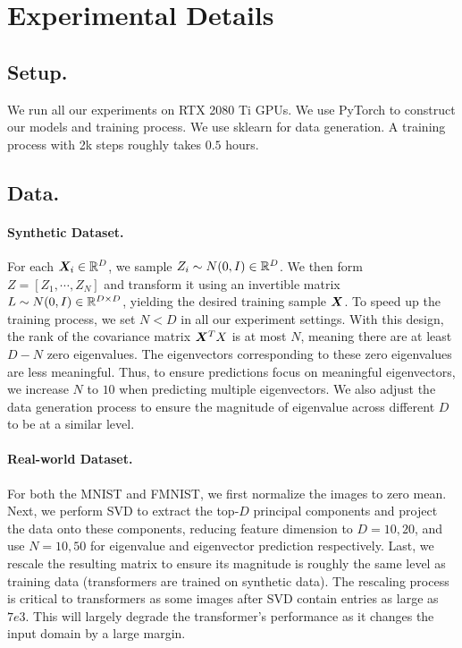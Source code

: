 \clearpage

\section{Experimental Details}\label{sec:exp_details}

\subsection{Setup.}
We run all our experiments on RTX 2080 Ti GPUs.
We use PyTorch to construct our models and training process.
We use sklearn for data generation.
A training process with 2k steps roughly takes $0.5$ hours.



\subsection{Data.}\label{appendix:data}
\paragraph{Synthetic Dataset.}
For each $\boldsymbol{X}_i \in \mathbb{R}^D$, we sample $Z_i \sim N(0, I) \in \mathbb{R}^D$.
We then form $Z = [Z_1, \cdots, Z_N]$ and transform it using an invertible matrix $L \sim N(0, I) \in \mathbb{R} ^{D \times D}$, yielding the desired training sample $\boldsymbol{X}$.
To speed up the training process, we set $N < D$ in all our experiment settings.
With this design, the rank of the covariance matrix  $\boldsymbol{X}^T X$ is at most $N$, meaning there are at least $D-N$ zero eigenvalues.
The eigenvectors corresponding to these zero eigenvalues are less meaningful.
Thus, to ensure predictions focus on meaningful eigenvectors, we increase $N$ to $10$ when predicting multiple eigenvectors.
We also adjust the data generation process to ensure the magnitude of eigenvalue across different $D$ to be at a similar level.

\paragraph{Real-world Dataset.}
For both the MNIST and FMNIST, we first normalize the images to zero mean.
Next, we perform SVD to extract the top-$D$ principal components and project the data onto these components, reducing feature dimension to $D = 10, 20$, and use $N = 10, 50$ for eigenvalue and eigenvector prediction respectively.
Last, we rescale the resulting matrix to ensure its magnitude is roughly the same level as training data (transformers are trained on synthetic data).
The rescaling process is critical to transformers as some images after SVD contain entries as large as $7e3$.
This will largely degrade the transformer's performance as it changes the input domain by a large margin.

